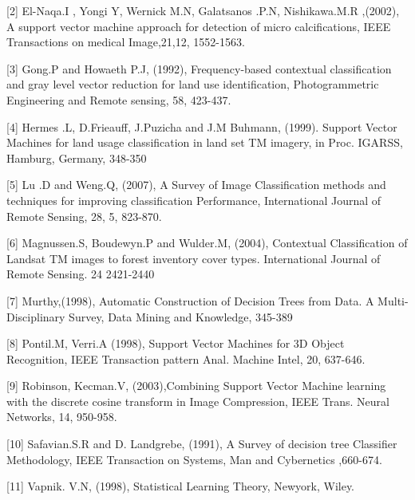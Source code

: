 \documentclass[11pt]{article}
\begin{document}
[2] El-Naqa.I , Yongi Y, Wernick M.N, Galatsanos .P.N, Nishikawa.M.R ,(2002), A support vector machine approach for detection of micro calcifications, IEEE Transactions on medical Image,21,12, 1552-1563.

[3] Gong.P and Howaeth P.J, (1992), Frequency-based contextual classification and gray level vector reduction for land use identification, Photogrammetric Engineering and Remote sensing, 58, 423-437.

[4] Hermes .L, D.Frieauff, J.Puzicha and J.M Buhmann, (1999). Support Vector Machines for land usage classification in land set TM imagery, in Proc. IGARSS, Hamburg, Germany, 348-350

[5] Lu .D and Weng.Q, (2007), A Survey of Image Classification methods and techniques for improving classification Performance, International Journal of Remote Sensing, 28, 5, 823-870.

[6] Magnussen.S, Boudewyn.P and Wulder.M, (2004), Contextual Classification of Landsat TM images to forest inventory cover types. International Journal of Remote Sensing. 24 2421-2440

[7] Murthy,(1998), Automatic Construction of Decision Trees from Data. A Multi-Disciplinary Survey, Data Mining and Knowledge, 345-389

[8] Pontil.M, Verri.A (1998), Support Vector Machines for 3D Object Recognition, IEEE Transaction pattern Anal. Machine Intel, 20, 637-646.

[9] Robinson, Kecman.V, (2003),Combining Support Vector Machine learning with the discrete cosine transform in Image Compression, IEEE Trans. Neural Networks, 14, 950-958.

[10] Safavian.S.R and D. Landgrebe, (1991), A Survey of decision tree Classifier Methodology, IEEE Transaction on Systems, Man and Cybernetics ,660-674.

[11] Vapnik. V.N, (1998), Statistical Learning Theory, Newyork, Wiley.

%
%
\end{document}

